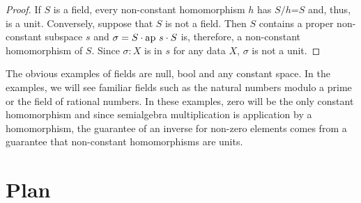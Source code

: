 \documentclass[11pt]{article}
\begin{document}
\begin{proof} If $S$ is a field, every non-constant homomorphism $h$ has $S/h$=$S$ and, thus, is a unit.  Conversely, 
suppose that $S$ is not a field.  Then $S$ contains a proper non-constant subspace $s$ and $\sigma = S\cdot {\rm ap}\ s\cdot S$ is,
therefore, a non-constant homomorphism of $S$.  Since $\sigma:X$ is in $s$ for any data $X$, $\sigma$ is not a unit. 
\end{proof}
\noindent 
The obvious examples of fields are null, bool and any constant space.  In the examples, we will see familiar fields such 
as the natural numbers modulo a prime or the field of rational numbers.  In these examples, zero will be the only constant 
homomorphism and since semialgebra multiplication is application by a homomorphism, the guarantee of an inverse 
for non-zero elements comes from a guarantee that non-constant homomorphisms are units.   

\section{Plan}
\end{document}
